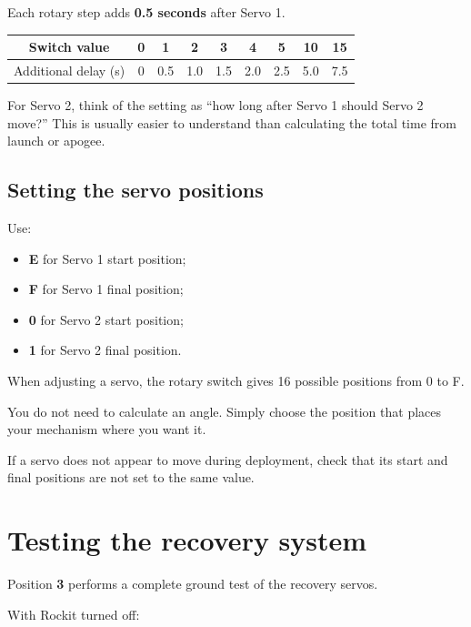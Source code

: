 \documentclass[11pt,a4paper]{article}
\begin{document}
Each rotary step adds \textbf{0.5 seconds} after Servo 1.

\begin{center}
\begin{tabular}{c|cccccccc}
Switch value & 0 & 1 & 2 & 3 & 4 & 5 & 10 & 15 \\
\hline
Additional delay (s) & 0 & 0.5 & 1.0 & 1.5 & 2.0 & 2.5 & 5.0 & 7.5
\end{tabular}
\end{center}

\begin{tipbox}
For Servo 2, think of the setting as ``how long after Servo 1 should Servo 2 move?'' This is usually easier to understand than calculating the total time from launch or apogee.
\end{tipbox}

\subsection{Setting the servo positions}

Use:

\begin{itemize}
    \item \textbf{E} for Servo 1 start position;
    \item \textbf{F} for Servo 1 final position;
    \item \textbf{0} for Servo 2 start position;
    \item \textbf{1} for Servo 2 final position.
\end{itemize}

When adjusting a servo, the rotary switch gives 16 possible positions from 0 to F.

You do not need to calculate an angle. Simply choose the position that places your mechanism where you want it.

\begin{tipbox}
If a servo does not appear to move during deployment, check that its start and final positions are not set to the same value.
\end{tipbox}

\section{Testing the recovery system}

Position \textbf{3} performs a complete ground test of the recovery servos.

With Rockit turned off:
\end{document}
